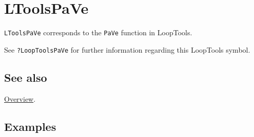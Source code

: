 \documentclass[../FeynHelpersManual.tex]{subfiles}
\begin{document}
\hypertarget{ltoolspave}{
\section{LToolsPaVe}\label{ltoolspave}}

\texttt{LToolsPaVe} corresponds to the \texttt{PaVe} function in
LoopTools.

See \texttt{?LoopTools\textasciigrave PaVe} for further information
regarding this LoopTools symbol.

\subsection{See also}

\hyperlink{toc}{Overview}.

\subsection{Examples}
\end{document}
